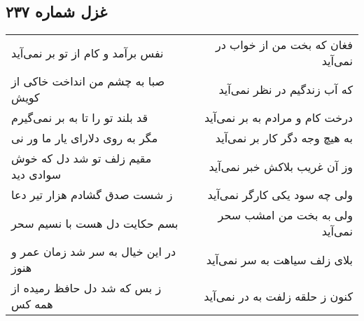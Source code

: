 \begin{center}
\section*{غزل شماره ۲۳۷}
\label{sec:sh237}
\begin{longtable}{l p{0.5cm} r}
نفس برآمد و کام از تو بر نمی‌آید
&&
فغان که بخت من از خواب در نمی‌آید
\\
صبا به چشم من انداخت خاکی از کویش
&&
که آب زندگیم در نظر نمی‌آید
\\
قد بلند تو را تا به بر نمی‌گیرم
&&
درخت کام و مرادم به بر نمی‌آید
\\
مگر به روی دلارای یار ما ور نی
&&
به هیچ وجه دگر کار بر نمی‌آید
\\
مقیم زلف تو شد دل که خوش سوادی دید
&&
وز آن غریب بلاکش خبر نمی‌آید
\\
ز شست صدق گشادم هزار تیر دعا
&&
ولی چه سود یکی کارگر نمی‌آید
\\
بسم حکایت دل هست با نسیم سحر
&&
ولی به بخت من امشب سحر نمی‌آید
\\
در این خیال به سر شد زمان عمر و هنوز
&&
بلای زلف سیاهت به سر نمی‌آید
\\
ز بس که شد دل حافظ رمیده از همه کس
&&
کنون ز حلقه زلفت به در نمی‌آید
\\
\end{longtable}
\end{center}

